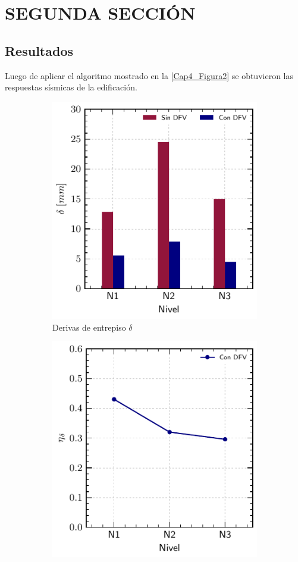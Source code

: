 \section{SEGUNDA SECCIÓN}

	\subsection{Resultados} \label{subsection:Resul_DFV}

Luego de aplicar el algoritmo mostrado en la \autoref{Cap4_Figura2} se obtuvieron las respuestas sísmicas de la edificación. 

\begin{figure}[!h]
     \centering
     \begin{subfigure}[b]{0.45\textwidth}
         \centering
         \includegraphics[scale=1]{E_IMAGENES/2_Capitulo4/Cap4_Imagen4a.pdf}
         \caption{\raggedleft Derivas de entrepiso $\delta$ \hspace*{0.5cm}}
         \label{Cap4_Figura4a}
     \end{subfigure}
	\hspace{3mm}
     \begin{subfigure}[b]{0.45\textwidth}
         \centering
         \includegraphics[scale=1]{E_IMAGENES/2_Capitulo4/Cap4_Imagen4b.pdf}

\end{subfigure}
\end{figure}
